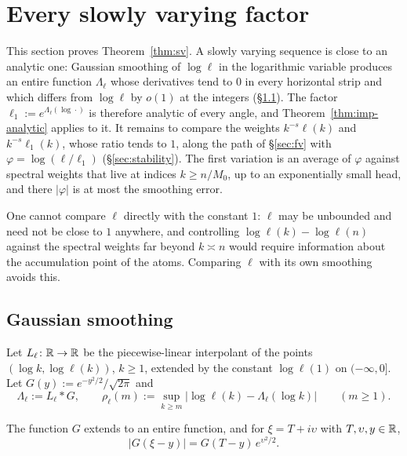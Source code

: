 \section{Every slowly varying factor}\label{sec:sv}

This section proves Theorem~\ref{thm:sv}. A slowly varying sequence is close to an analytic one: Gaussian smoothing
of $\log\ell$ in the logarithmic variable produces an entire function $\Lambda_\ell$ whose derivatives tend to $0$ in
every horizontal strip and which differs from $\log\ell$ by $o(1)$ at the integers (\S\ref{sec:smoothing}). The factor
$\ell_1:=e^{\Lambda_\ell(\log\cdot)}$ is therefore analytic of every angle, and Theorem~\ref{thm:imp-analytic} applies to
it. It remains to compare the weights $k^{-s}\ell(k)$ and $k^{-s}\ell_1(k)$, whose ratio tends to $1$, along the path
of \S\ref{sec:fv} with $\varphi=\log(\ell/\ell_1)$ (\S\ref{sec:stability}). The first variation is an average of
$\varphi$ against spectral weights that live at indices $k\ge n/M_0$, up to an exponentially small head, and there
$|\varphi|$ is at most the smoothing error.

One cannot compare $\ell$ directly with the constant $1$: $\ell$ may be unbounded and need not be close to $1$
anywhere, and controlling $\log\ell(k)-\log\ell(n)$ against the spectral weights far beyond $k\asymp n$ would require
information about the accumulation point of the atoms. Comparing $\ell$ with its own smoothing avoids this.

\subsection{Gaussian smoothing}\label{sec:smoothing}

\begin{definition}[smoothing]\label{def:smoothing}
Let $L_\ell\colon\mathbb{R}\to\mathbb{R}$ be the piecewise-linear interpolant of the points $(\log k,\log\ell(k))$, $k\ge1$,
extended by the constant $\log\ell(1)$ on $(-\infty,0]$. Let $G(y):=e^{-y^2/2}/\sqrt{2\pi}$ and
\[
  \Lambda_\ell:=L_\ell*G,\qquad \rho_\ell(m):=\sup_{k\ge m}\bigl|\log\ell(k)-\Lambda_\ell(\log k)\bigr|\qquad(m\ge1).
\]
\end{definition}

The function $G$ extends to an entire function, and for $\xi=T+i\upsilon$ with $T,\upsilon,y\in\mathbb{R}$,
\begin{equation}\label{eq:gauss-abs}
  |G(\xi-y)|=G(T-y)\,e^{\upsilon^2/2}.
\end{equation}

